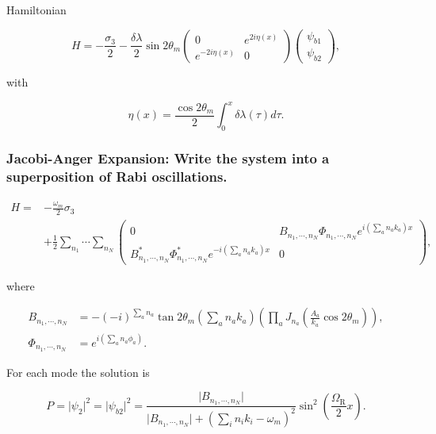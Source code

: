 \documentclass[%
preprint,
 amsmath,amssymb,
 aps,
]{revtex4-1}
\begin{document}
Hamiltonian

\begin{equation}
 H = -\frac{\sigma_3}{2} - \frac{\delta \lambda}{2} \sin 2\theta_m \begin{pmatrix} 0 & e^{2i\eta(x)} \\ e^{-2 i\eta(x) } & 0 \end{pmatrix}  \begin{pmatrix} \psi_{b1} \\ \psi_{b2} \end{pmatrix},
\end{equation}

with

\begin{equation}
 \eta(x) =  \frac{\cos 2\theta_m}{2} \int_0^x \delta\lambda (\tau) d\tau.
\end{equation}


\subsubsection{Jacobi-Anger Expansion: Write the system into a superposition of Rabi oscillations.}
    
    
\begin{align}
H =& -\frac{\omega_m}{2} \sigma_3 \nonumber \\
&+ \frac{1}{2} \sum_{n_1} \cdots \sum_{n_N} \begin{pmatrix} 0 & B_{n_1,\cdots,n_N} \Phi_{n_1,\cdots, n_N} e^{i \left( \sum_{a} n_a k_a   \right)x} \\ B_{n_1,\cdots,n_N}^* \Phi_{n_1,\cdots, n_N}^* e^{-i \left( \sum_{a} n_a k_a   \right)x} & 0 \end{pmatrix},
\end{align}

where

\begin{align}
B_{n_1,\cdots,n_N} &= -(-i)^{\sum_a n_a} \tan 2\theta_m \left( \sum_a n_a k_a \right) \left( \prod_a J_{n_a}\left( \frac{A_a}{k_a}\cos 2\theta_m \right) \right),\\
\Phi_{n_1,\cdots, n_N} &= e^{i\left( \sum_a n_a \phi_a \right)}.
\end{align}


For each mode the solution is

\begin{equation}
P = \lvert \psi_2 \rvert^2 = \lvert \psi_{b2} \rvert^2 = \frac{\lvert B_{n_1,\cdots,n_N} \rvert}{\lvert B_{n_1,\cdots,n_N} \rvert + (\sum_i n_i k_i - \omega_m )^2} \sin^2 \left( \frac{\Omega_{\mathrm R}}{2} x \right) .
\end{equation}
\end{document}
